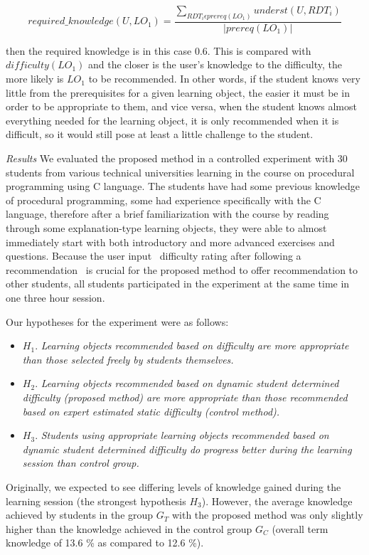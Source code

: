 \documentclass{llncs}
\begin{document}
$$required\_knowledge(U, LO_1) = \frac{\sum_{RDT_i\epsilon prereq(LO_1)} underst(U, RDT_i)}{|prereq(LO_1)|}$$

then the required knowledge is in this case 0.6. This is compared with $difficulty (LO_1)$ and the closer is the user's knowledge to the difficulty, the more likely is $LO_1$ to be recommended. In other words, if the student knows very little from the prerequisites for a given learning object, the easier it must be in order to be appropriate to them, and vice versa, when the student knows almost everything needed for the learning object, it is only recommended when it is difficult, so it would still pose at least a little challenge to the student.

\emph{Results} We evaluated the proposed method in a controlled experiment with 30 students from various technical universities learning in the course on procedural programming using C language. The students have had some previous knowledge of procedural programming, some had experience specifically with the C language, therefore after a brief familiarization with the course by reading through some explanation-type learning objects, they were able to almost immediately start with both introductory and more advanced exercises and questions. Because the user input \textendash~difficulty rating after following a recommendation \textendash~is crucial for the proposed method to offer recommendation to other students, all students participated in the experiment at the same time in one three hour session.

Our hypotheses for the experiment were as follows:

\begin{itemize}
\item $H_1$. \emph{Learning objects recommended based on difficulty are more appropriate than those selected freely by students themselves.}
\item $H_2$. \emph{Learning objects recommended based on dynamic student determined difficulty (proposed method) are more appropriate than those recommended based on expert estimated static difficulty (control method).}
\item $H_3$. \emph{Students using appropriate learning objects recommended based on dynamic student determined difficulty do progress better during the learning session than control group.}
\end{itemize}

Originally, we expected to see differing levels of knowledge gained during the learning session (the strongest hypothesis $H_3$). However, the average knowledge achieved by students in the group $G_T$ with the proposed method was only slightly higher than the knowledge achieved in the control group $G_C$ (overall term knowledge of 13.6 \% as compared to 12.6 \%).
\end{document}
